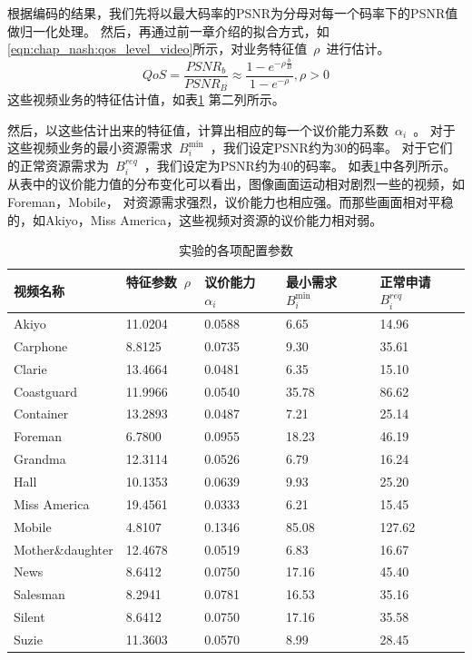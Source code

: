 根据编码的结果，我们先将以最大码率的PSNR为分母对每一个码率下的PSNR值做归一化处理。
然后，再通过前一章介绍的拟合方式，如\eqref{eqn:chap_nash:qos_level_video}所示，对业务特征值~$\rho$~进行估计。
\begin{equation}
QoS = \frac{PSNR_b}{PSNR_B} \approx \frac{1- e^{-\rho \frac{b}{B} }}{1-e^{-\rho}}, \rho > 0
\label{eqn:chap_nash:qos_level_video}
\end{equation}
这些视频业务的特征估计值，如表\ref{tab:chap_nash:before_simulation} 第二列所示。

然后，以这些估计出来的特征值，计算出相应的每一个议价能力系数~$\alpha_i$~。
对于这些视频业务的最小资源需求~$B_i^{\min}$~，我们设定PSNR约为30的码率。
对于它们的正常资源需求为~$B_i^{req}$~，我们设定为PSNR约为40的码率。
如表\ref{tab:chap_nash:before_simulation}中各列所示。
从表中的议价能力值的分布变化可以看出，图像画面运动相对剧烈一些的视频，如Foreman，Mobile，
对资源需求强烈，议价能力也相应强。而那些画面相对平稳的，如Akiyo，Miss America，这些视频对资源的议价能力相对弱。
\begin{table}[tb]
    \wuhao
    \centering
    \caption{实验的各项配置参数}
    \begin{tabular*}{0.98\textwidth}{l p{}  p{}  p{}  p{} } 
    \toprule
    视频名称 &特征参数~$\rho$~ & 议价能力~$\alpha_i$~ & 最小需求~$B_i^{\min}$~ & 正常申请~$B_i^{req}$~ \\
    \midrule
Akiyo           	 & 11.0204 & 0.0588 & 6.65 & 14.96  \\ 
Carphone        	 & 8.8125 & 0.0735 & 9.30 & 35.61  \\ 
Clarie          	 & 13.4664 & 0.0481 & 6.35 & 15.10  \\ 
Coastguard      	 & 11.9966 & 0.0540 & 35.78 & 86.62  \\ 
Container       	 & 13.2893 & 0.0487 & 7.21 & 25.14  \\ 
Foreman         	 & 6.7800 & 0.0955 & 18.23 & 46.19  \\ 
Grandma         	 & 12.3114 & 0.0526 & 6.79 & 16.24  \\ 
Hall            	 & 10.1353 & 0.0639 & 9.93 & 25.20  \\ 
Miss America    	 & 19.4561 & 0.0333 & 6.21 & 15.45  \\ 
Mobile          	 & 4.8107 & 0.1346 & 85.08 & 127.62  \\ 
Mother\&daughter	 & 12.4678 & 0.0519 & 6.83 & 16.67  \\ 
News            	 & 8.6412 & 0.0750 & 17.16 & 45.40  \\ 
Salesman        	 & 8.2941 & 0.0781 & 16.53 & 35.16  \\ 
Silent          	 & 8.6412 & 0.0750 & 17.16 & 35.58  \\ 
Suzie           	 & 11.3603 & 0.0570 & 8.99 & 28.45  \\ 
    \bottomrule
         \end{tabular*}
    \label{tab:chap_nash:before_simulation}
\end{table}

